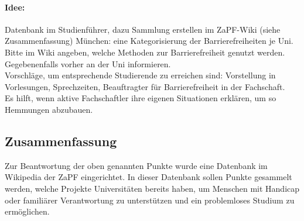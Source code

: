     \paragraph{Idee:}
      Datenbank im Studienführer, dazu Sammlung erstellen im ZaPF-Wiki (siehe Zusammenfassung)
      München: eine Kategorisierung der Barrierefreiheiten je Uni.
      Bitte im Wiki angeben, welche Methoden zur Barrierefreiheit genutzt werden.
      Gegebenenfalls vorher an der Uni informieren. \\

      Vorschläge, um entsprechende Studierende zu erreichen sind: Vorstellung in Vorlesungen, Sprechzeiten, Beauftragter für Barrierefreiheit in der Fachschaft. \\

      Es hilft, wenn aktive Fachschaftler ihre eigenen Situationen erklären, um so Hemmungen abzubauen.

    \subsection*{Zusammenfassung}
      Zur Beantwortung der oben genannten Punkte wurde eine Datenbank im Wikipedia der ZaPF eingerichtet.
      In dieser Datenbank sollen Punkte gesammelt werden, welche Projekte Universitäten bereits haben, um Menschen mit Handicap oder familiärer Verantwortung zu unterstützen und ein problemloses Studium zu ermöglichen.

